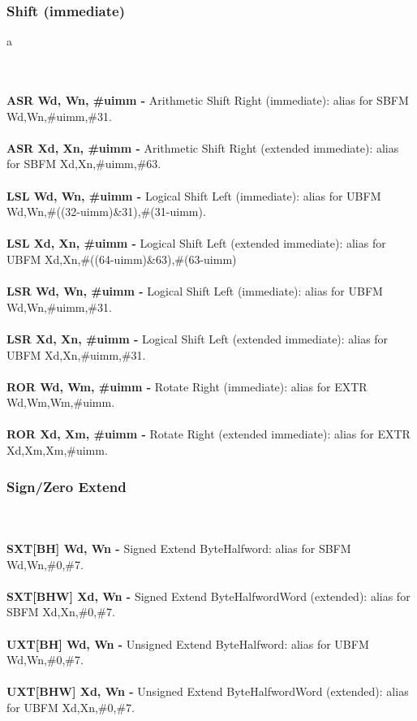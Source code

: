 \documentclass[12pt,a4paper,utf8]{ppgsi}
\begin{document}
\subsubsection{Shift (immediate)}
a

\\\\\textbf{ASR Wd, Wn, \#uimm -} Arithmetic Shift Right (immediate): alias for SBFM Wd,Wn,\#uimm,\#31. 
\\\\\textbf{ASR Xd, Xn, \#uimm -} Arithmetic Shift Right (extended immediate): alias for SBFM Xd,Xn,\#uimm,\#63. 
\\\\\textbf{LSL Wd, Wn, \#uimm -} Logical Shift Left (immediate): alias for UBFM Wd,Wn,\#((32-uimm)\&31),\#(31-uimm). 
\\\\\textbf{LSL Xd, Xn, \#uimm -} Logical Shift Left (extended immediate): alias for UBFM Xd,Xn,\#((64-uimm)\&63),\#(63-uimm) 
\\\\\textbf{LSR Wd, Wn, \#uimm -} Logical Shift Left (immediate): alias for UBFM Wd,Wn,\#uimm,\#31. 
\\\\\textbf{LSR Xd, Xn, \#uimm -} Logical Shift Left (extended immediate): alias for UBFM Xd,Xn,\#uimm,\#31. 
\\\\\textbf{ROR Wd, Wm, \#uimm -} Rotate Right (immediate): alias for EXTR Wd,Wm,Wm,\#uimm.  
\\\\\textbf{ROR Xd, Xm, \#uimm -} Rotate Right (extended immediate): alias for EXTR Xd,Xm,Xm,\#uimm. 


\subsubsection{Sign/Zero Extend}
\\\\\textbf{SXT[BH] Wd, Wn -} Signed Extend Byte\textbar Halfword: alias for SBFM Wd,Wn,\#0,\#7. 
\\\\\textbf{SXT[BHW] Xd, Wn -} Signed Extend Byte\textbar Halfword\textbar Word (extended): alias for SBFM Xd,Xn,\#0,\#7. 
\\\\\textbf{UXT[BH] Wd, Wn -} Unsigned Extend Byte\textbar Halfword: alias for UBFM Wd,Wn,\#0,\#7. 
\\\\\textbf{UXT[BHW] Xd, Wn -} Unsigned Extend Byte\textbar Halfword\textbar Word (extended): alias for UBFM Xd,Xn,\#0,\#7. 
\end{document}
